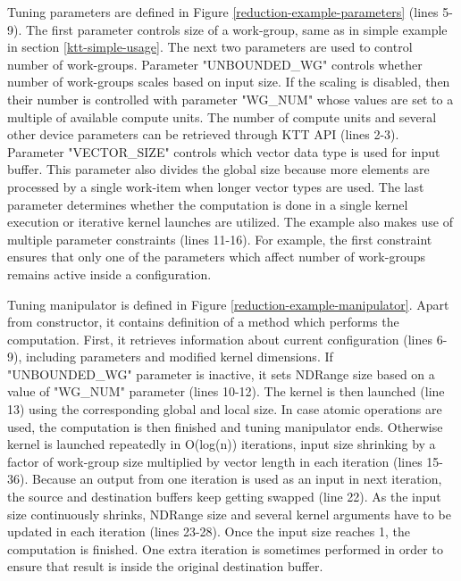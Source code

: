 \documentclass
[
    digital, %
    oneside, %
    table, %
    nolof, %
    nolot, %
    nocover %
]{fithesis3}
\begin{document}
Tuning parameters are defined in Figure \ref{reduction-example-parameters} (lines 5-9). The first parameter controls size of a work-group, same as in
simple example in section \ref{ktt-simple-usage}. The next two parameters are used to control number of work-groups. Parameter "UNBOUNDED\_WG" controls
whether number of work-groups scales based on input size. If the scaling is disabled, then their number is controlled with parameter "WG\_NUM" whose
values are set to a multiple of available compute units. The number of compute units and several other device parameters can be retrieved through KTT API
(lines 2-3). Parameter "VECTOR\_SIZE" controls which vector data type is used for input buffer. This parameter also divides the global size because
more elements are processed by a single work-item when longer vector types are used. The last parameter determines whether the computation is done
in a single kernel execution or iterative kernel launches are utilized. The example also makes use of multiple parameter constraints (lines 11-16).
For example, the first constraint ensures that only one of the parameters which affect number of work-groups remains active inside a configuration.

Tuning manipulator is defined in Figure \ref{reduction-example-manipulator}. Apart from constructor, it contains definition of a method which performs
the computation. First, it retrieves information about current configuration (lines 6-9), including parameters and modified kernel dimensions. If
"UNBOUNDED\_WG" parameter is inactive, it sets NDRange size based on a value of "WG\_NUM" parameter (lines 10-12). The kernel is then launched (line 13)
using the corresponding global and local size. In case atomic operations are used, the computation is then finished and tuning manipulator ends. Otherwise
kernel is launched repeatedly in O(log(n)) iterations, input size shrinking by a factor of work-group size multiplied by vector length in each iteration
(lines 15-36). Because an output from one iteration is used as an input in next iteration, the source and destination buffers keep getting swapped (line 22).
As the input size continuously shrinks, NDRange size and several kernel arguments have to be updated in each iteration (lines 23-28). Once the input size
reaches 1, the computation is finished. One extra iteration is sometimes performed in order to ensure that result is inside the original destination buffer.
\end{document}
